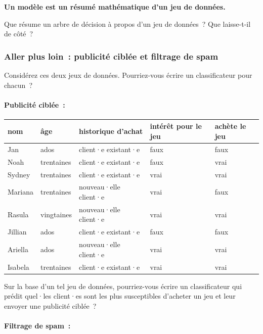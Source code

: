 \documentclass[12pt,a4paper]{article}
\begin{document}
\begin{keypointbox}
  \textbf{Un modèle est un résumé mathématique d'un jeu de données.}

  Que résume un arbre de décision à propos d'un jeu de données~? Que laisse-t-il de côté~?
\end{keypointbox}

\subsubsection{Aller plus loin~: publicité ciblée et filtrage de spam}

Considérez ces deux jeux de données. Pourriez-vous écrire un classificateur pour chacun~?

\paragraph{Publicité ciblée~:}

\begin{center}
\begin{tabularx}{\textwidth}{l l l l l}
  \toprule
  \textbf{nom} & \textbf{âge} & \textbf{historique d'achat} & \textbf{intérêt pour le jeu} & \textbf{achète le jeu} \\
  \midrule
  Jan      & ados       & client·e existant·e & faux  & faux \\
  Noah      & trentaines & client·e existant·e & faux  & vrai \\
  Sydney    & trentaines & client·e existant·e & vrai  & vrai \\
  Mariana   & trentaines & nouveau·elle client·e & vrai  & faux \\
  Rasula    & vingtaines & nouveau·elle client·e & vrai  & vrai \\
  Jillian   & ados       & client·e existant·e & faux  & faux \\
  Ariella   & ados       & nouveau·elle client·e & vrai  & vrai \\
  Isabela   & trentaines & client·e existant·e & vrai  & vrai \\
  \bottomrule
\end{tabularx}
\end{center}

Sur la base d'un tel jeu de données, pourriez-vous écrire un classificateur qui prédit quel·les client·es sont les plus susceptibles d'acheter un jeu et leur envoyer une publicité ciblée~?

\paragraph{Filtrage de spam~:}
\end{document}

